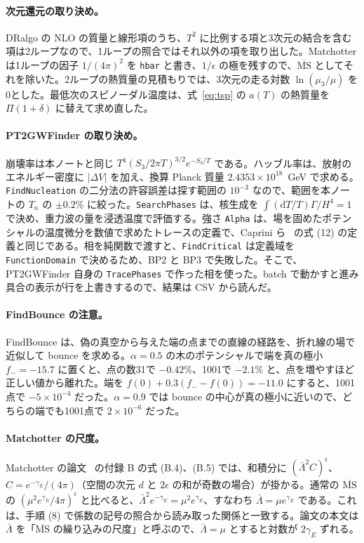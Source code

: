 \documentclass[a4paper,10pt]{ltjsarticle}
\newcommand{\dd}{\mathrm{d}}
\begin{document}
\paragraph{次元還元の取り決め。}DRalgo の NLO の質量と線形項のうち、$T^2$ に比例する項と3次元の結合を含む項は2ループなので、1ループの照合ではそれ以外の項を取り出した。Matchotter は1ループの因子 $1/(4\pi)^2$ を \texttt{hbar} と書き、$1/\epsilon$ の極を残すので、$\overline{\mathrm{MS}}$ としてそれを除いた。2ループの熱質量の見積もりでは、3次元の走る対数 $\ln(\mu_3/\mu)$ を0とした。最低次のスピノーダル温度は、式~\eqref{eq:tsp} の $a(T)$ の熱質量を $\Pi(1+\delta)$ に替えて求め直した。

\paragraph{PT2GWFinder の取り決め。}崩壊率は本ノートと同じ $T^4(S_3/2\pi T)^{3/2}e^{-S_3/T}$ である。ハッブル率は、放射のエネルギー密度に $|\Delta V|$ を加え、換算 Planck 質量 $2.4353\times10^{18}$~GeV で求める。\texttt{FindNucleation} の二分法の許容誤差は探す範囲の $10^{-3}$ なので、範囲を本ノートの $T_n$ の $\pm0.2\%$ に絞った。\texttt{SearchPhases} は、核生成を $\int(\dd T/T)\Gamma/H^4=1$ で決め、重力波の量を浸透温度で評価する。強さ \texttt{Alpha} は、場を固めたポテンシャルの温度微分を数値で求めたトレースの定義で、Caprini ら~\cite{caprini20} の式 (12) の定義と同じである。相を純関数で渡すと、\texttt{FindCritical} は定義域を \texttt{FunctionDomain} で決めるため、BP2 と BP3 で失敗した。そこで、PT2GWFinder 自身の \texttt{TracePhases} で作った相を使った。batch で動かすと進み具合の表示が行を上書きするので、結果は CSV から読んだ。

\paragraph{FindBounce の注意。}FindBounce は、偽の真空から与えた端の点までの直線の経路を、折れ線の場で近似して bounce を求める。$\alpha=0.5$ の木のポテンシャルで端を真の極小 $f_-=-15.7$ に置くと、点の数31で $-0.42\%$、1001で $-2.1\%$ と、点を増やすほど正しい値から離れた。端を $f(0)+0.3(f_--f(0))=-11.0$ にすると、1001点で $-5\times10^{-4}$ だった。$\alpha=0.9$ では bounce の中心が真の極小に近いので、どちらの端でも1001点で $2\times10^{-6}$ だった。

\paragraph{Matchotter の尺度。}Matchotter の論文~\cite{matchotter} の付録 B の式 (B.4)、(B.5) では、和積分に $(\bar\Lambda^2C)^\epsilon$、$C=e^{-\gamma_E}/(4\pi)$（空間の次元 $d$ と $2\epsilon$ の和が奇数の場合）が掛かる。通常の $\overline{\mathrm{MS}}$ の $(\mu^2e^{\gamma_E}/4\pi)^\epsilon$ と比べると、$\bar\Lambda^2e^{-\gamma_E}=\mu^2e^{\gamma_E}$、すなわち $\bar\Lambda=\mu e^{\gamma_E}$ である。これは、手順 (8) で係数の記号の照合から読み取った関係と一致する。論文の本文は $\bar\Lambda$ を「$\overline{\mathrm{MS}}$ の繰り込みの尺度」と呼ぶので、$\bar\Lambda=\mu$ とすると対数が $2\gamma_E$ ずれる。
\end{document}
